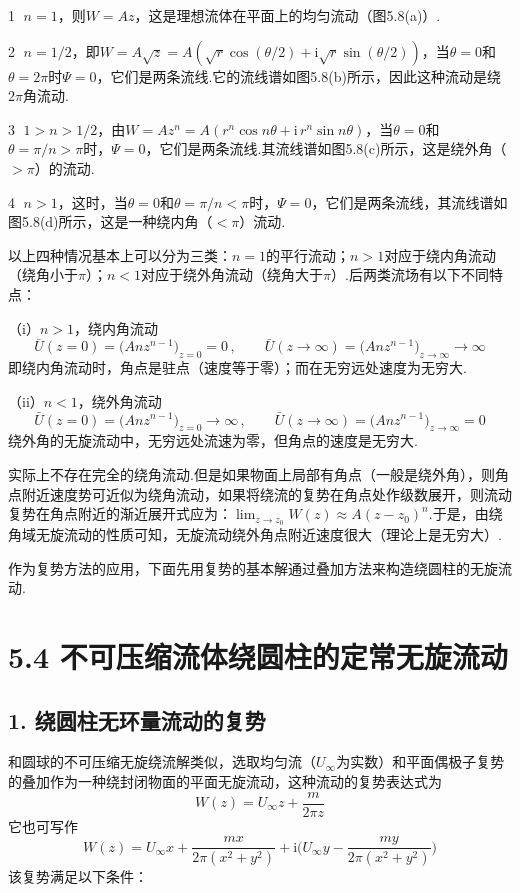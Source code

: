 \textcircled{1} $n=1$，则$W=Az$，这是理想流体在平面上的均匀流动（图5.8(a)）.

\textcircled{2} $n=1/2$，即$W=A\sqrt{z}=A(\sqrt{r}\cos(\theta/2)+\mathrm{i}\sqrt{r}\sin(\theta/2))$，当$\theta=0$和$\theta=2\pi$时$\Psi=0$，它们是两条流线.它的流线谱如图5.8(b)所示，因此这种流动是绕$2\pi$角流动.

\textcircled{3} $1>n>1/2$，由$W=Az^{n}=A(r^{n}\cos n\theta+\mathrm{i}\,r^{n}\sin n\theta)$，当$\theta=0$和$\theta=\pi/n>\pi$时，$\Psi=0$，它们是两条流线.其流线谱如图5.8(c)所示，这是绕外角（$>\pi$）的流动.

\textcircled{4} $n>1$，这时，当$\theta=0$和$\theta=\pi/n<\pi$时，$\Psi=0$，它们是两条流线，其流线谱如图5.8(d)所示，这是一种绕内角（$<\pi$）流动.

以上四种情况基本上可以分为三类：$n=1$的平行流动；$n>1$对应于绕内角流动（绕角小于$\pi$）；$n<1$对应于绕外角流动（绕角大于$\pi$）.后两类流场有以下不同特点：

（i）$n>1$，绕内角流动
\[
\bar{U}(z=0)=\big(Anz^{n-1}\big)_{z=0}=0\,,\qquad \bar{U}(z\to\infty)=\big(Anz^{n-1}\big)_{z\to\infty}\to\infty
\]
即绕内角流动时，角点是驻点（速度等于零）；而在无穷远处速度为无穷大.

（ii）$n<1$，绕外角流动
\[
\bar{U}(z=0)=\big(Anz^{n-1}\big)_{z=0}\to\infty\,,\qquad \bar{U}(z\to\infty)=\big(Anz^{n-1}\big)_{z\to\infty}=0
\]
绕外角的无旋流动中，无穷远处流速为零，但角点的速度是无穷大.

实际上不存在完全的绕角流动.但是如果物面上局部有角点（一般是绕外角），则角点附近速度势可近似为绕角流动，如果将绕流的复势在角点处作级数展开，则流动复势在角点附近的渐近展开式应为：$\displaystyle\lim_{z\to z_0}W(z)\approx A(z-z_0)^{n}$.于是，由绕角域无旋流动的性质可知，无旋流动绕外角点附近速度很大（理论上是无穷大）.

作为复势方法的应用，下面先用复势的基本解通过叠加方法来构造绕圆柱的无旋流动.

\section*{5.4  不可压缩流体绕圆柱的定常无旋流动}

\subsection*{1. 绕圆柱无环量流动的复势}

和圆球的不可压缩无旋绕流解类似，选取均匀流（$U_\infty$为实数）和平面偶极子复势的叠加作为一种绕封闭物面的平面无旋流动，这种流动的复势表达式为
\begin{equation*}
W(z)=U_\infty z+\frac{m}{2\pi z}
\tag{5.52a}
\end{equation*}
它也可写作
\begin{equation*}
W(z)=U_\infty x+\frac{mx}{2\pi(x^{2}+y^{2})}+\mathrm{i}\Big(U_\infty y-\frac{my}{2\pi(x^{2}+y^{2})}\Big)
\tag{5.52b}
\end{equation*}
该复势满足以下条件：

